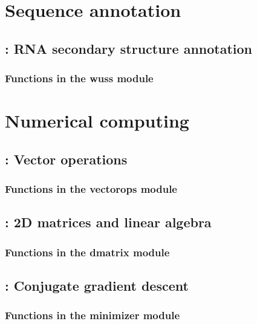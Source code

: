 \documentclass[10pt]{book}
\begin{document}
\chapter{Sequence annotation}

\newpage
\section{: RNA secondary structure annotation}

\subsection{Functions in the wuss module}



\chapter{Numerical computing}

\newpage
\section{: Vector operations}

\subsection{Functions in the vectorops module}


\newpage
\section{: 2D matrices and linear algebra}

\subsection{Functions in the dmatrix module}


\newpage
\section{: Conjugate gradient descent}

\subsection{Functions in the minimizer module}

\end{document}
